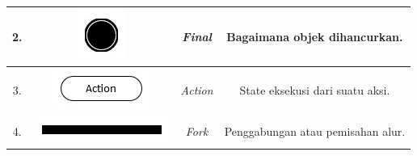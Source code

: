 \begin{table}[htbp]
\begin{center}
\begin{tabular}{|c|c|c|c| }
            2. & \begin{minipage}{.1\textwidth}
                \includegraphics[width=\linewidth]{bab2/gambar/uml/final.jpg}
            \end{minipage} & \textit{Final}   & Bagaimana  objek dihancurkan.             \\ \hline

            3. & \begin{minipage}{.2\textwidth}
                \includegraphics[width=\linewidth]{bab2/gambar/uml/action.jpg}
            \end{minipage} & \textit{Action}  & State eksekusi dari suatu aksi.           \\ \hline

            4. & \begin{minipage}{.2\textwidth}
                \includegraphics[width=\linewidth]{bab2/gambar/uml/fork.jpg}
            \end{minipage} & \textit{Fork}    & Penggabungan atau pemisahan alur.         \\ \hline


\end{tabular}
\end{center}
\end{table}
